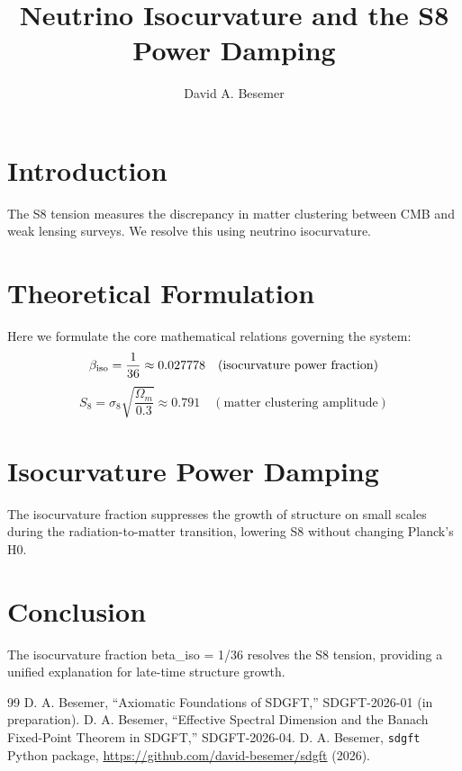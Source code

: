 \documentclass[a4paper,11pt]{article}
\begin{document}
\title{Neutrino Isocurvature and the S8 Power Damping}

\author{David A. Besemer}



\maketitle

\section{Introduction}
The S8 tension measures the discrepancy in matter clustering between CMB and weak lensing surveys. We resolve this using neutrino isocurvature.

\section{Theoretical Formulation}
Here we formulate the core mathematical relations governing the system:
\begin{equation}
  \beta_{\mathrm{iso}} = \frac{1}{36} \approx 0.027778 \quad (\text{isocurvature power fraction})
\end{equation}
\begin{equation}
  S_8 = \sigma_8 \sqrt{\frac{\Omega_m}{0.3}} \approx 0.791 \quad (\text{matter clustering amplitude})
\end{equation}
\section{Isocurvature Power Damping}
The isocurvature fraction suppresses the growth of structure on small scales during the radiation-to-matter transition, lowering S8 without changing Planck's H0.

\section{Conclusion}
The isocurvature fraction beta_iso = 1/36 resolves the S8 tension, providing a unified explanation for late-time structure growth.



\begin{thebibliography}{99}
 D. A. Besemer, ``Axiomatic Foundations of SDGFT,'' SDGFT-2026-01 (in preparation).
 D. A. Besemer, ``Effective Spectral Dimension and the Banach Fixed-Point Theorem in SDGFT,'' SDGFT-2026-04.
 D. A. Besemer, \texttt{sdgft} Python package, \url{https://github.com/david-besemer/sdgft} (2026).
\end{thebibliography}
\end{document}
